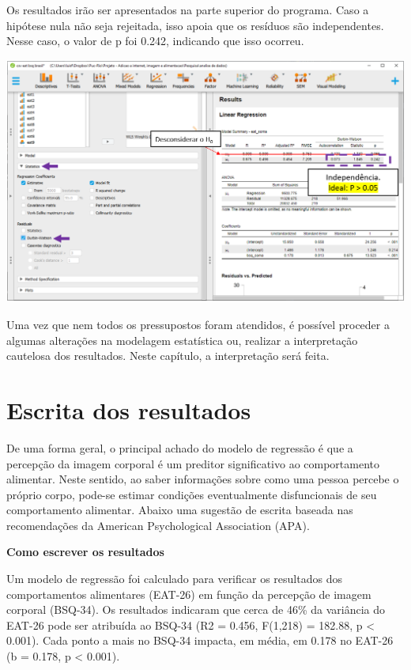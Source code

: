 \documentclass[
]{book}
\begin{document}
Os resultados irão ser apresentados na parte superior do programa. Caso a hipótese nula não seja rejeitada, isso apoia que os resíduos são independentes. Nesse caso, o valor de p foi 0.242, indicando que isso ocorreu.

\includegraphics{./img/cap_reg_independencia2_jasp.png}

Uma vez que nem todos os pressupostos foram atendidos, é possível proceder a algumas alterações na modelagem estatística ou, realizar a interpretação cautelosa dos resultados. Neste capítulo, a interpretação será feita.

\hypertarget{escrita-dos-resultados-13}{%
\section{Escrita dos resultados}\label{escrita-dos-resultados-13}}

De uma forma geral, o principal achado do modelo de regressão é que a percepção da imagem corporal é um preditor significativo ao comportamento alimentar. Neste sentido, ao saber informações sobre como uma pessoa percebe o próprio corpo, pode-se estimar condições eventualmente disfuncionais de seu comportamento alimentar. Abaixo uma sugestão de escrita baseada nas recomendações da American Psychological Association (APA).

\textbf{Como escrever os resultados}

Um modelo de regressão foi calculado para verificar os resultados dos comportamentos alimentares (EAT-26) em função da percepção de imagem corporal (BSQ-34). Os resultados indicaram que cerca de 46\% da variância do EAT-26 pode ser atribuída ao BSQ-34 (R2 = 0.456, F(1,218) = 182.88, p \textless{} 0.001). Cada ponto a mais no BSQ-34 impacta, em média, em 0.178 no EAT-26 (b = 0.178, p \textless{} 0.001).
\end{document}

